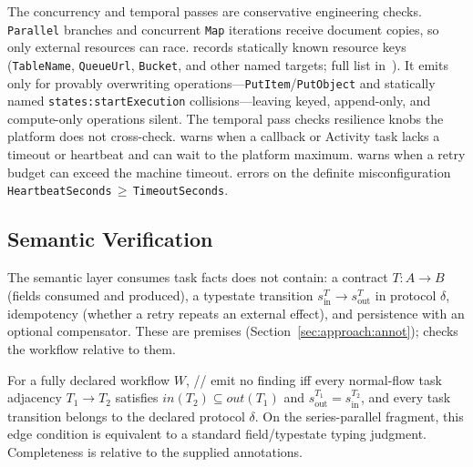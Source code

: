 The concurrency and temporal passes are conservative engineering checks. \texttt{Parallel} branches
and concurrent \texttt{Map} iterations receive document copies, so only external resources can
race. \tool{} records statically known resource keys (\texttt{TableName}, \texttt{QueueUrl},
\texttt{Bucket}, and other named targets; full list in~\cite{stepcheck-repo}). It emits 
only for provably overwriting operations---\texttt{PutItem}/\texttt{PutObject} and statically named
\texttt{states:startExecution} collisions---leaving keyed, append-only, and compute-only operations
silent.
The temporal pass checks resilience knobs the platform does not cross-check.  warns
when a callback or Activity task lacks a timeout or heartbeat and can wait to the platform maximum.
 warns when a retry budget can exceed the machine timeout.  errors on the
definite misconfiguration \texttt{HeartbeatSeconds}\,$\geq$\,\texttt{TimeoutSeconds}.

\vspace{-0.25cm}
\subsection{Semantic Verification}
\label{sec:approach:types}

The semantic layer consumes task facts \asl{} does not contain: a contract $T:A\rightarrow B$
(fields consumed and produced), a typestate transition
$s_{\mathrm{in}}^T\rightarrow s_{\mathrm{out}}^T$ in protocol $\delta$, idempotency (whether a retry
repeats an external effect), and persistence with an optional compensator. These are premises
(Section~\ref{sec:approach:annot}); \tool{} checks the workflow relative to them.

\vspace{-0.25cm}
\begin{proposition}\label{prop:typecheck}
For a fully declared workflow $W$, // emit no finding iff
every normal-flow task adjacency $T_1\to T_2$ satisfies
$\mathit{in}(T_2)\subseteq\mathit{out}(T_1)$ and
$s_{\mathrm{out}}^{T_1}=s_{\mathrm{in}}^{T_2}$, and every task transition belongs to the declared
protocol $\delta$. On the series-parallel fragment, this edge condition is equivalent to a standard
field/typestate typing judgment. Completeness is relative to the supplied annotations.
\end{proposition}


